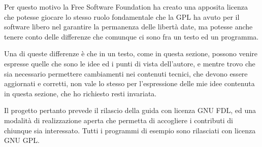 Per questo motivo la Free Software Foundation ha creato una apposita licenza
che potesse giocare lo stesso ruolo fondamentale che la GPL ha avuto per il
software libero nel garantire la permanenza delle libertà date, ma potesse
anche tenere conto delle differenze che comunque ci sono fra un testo ed un
programma.

Una di queste differenze è che in un testo, come in questa sezione, possono
venire espresse quelle che sono le idee ed i punti di vista dell'autore, e
mentre trovo che sia necessario permettere cambiamenti nei contenuti tecnici,
che devono essere aggiornati e corretti, non vale lo stesso per l'espressione
delle mie idee contenuta in questa sezione, che ho richiesto resti invariata.

Il progetto pertanto prevede il rilascio della guida con licenza GNU FDL, ed
una modalità di realizzazione aperta che permetta di accogliere i contributi
di chiunque sia interessato. Tutti i programmi di esempio sono rilasciati con
licenza GNU GPL.





